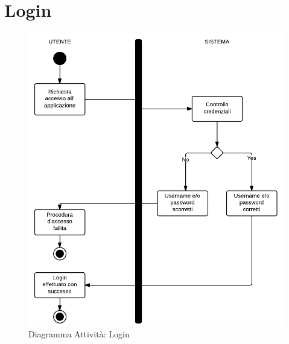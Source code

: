 \section{Login}
\begin{figure}[H]
\centering
\includegraphics[scale=0.43]{img/activity/Log.png}
\caption{Diagramma Attività: Login}
\label{fig:attlog}
\end{figure}


